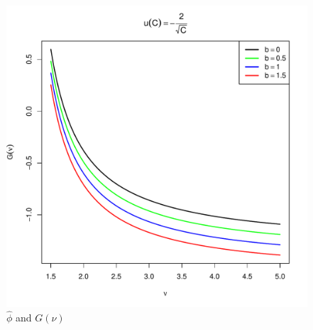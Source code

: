 \documentclass[11pt,a4]{amsart}
\newcommand{\1}{{\mathbf 1}}
\begin{document}
\begin{figure}[htb!]
\begin{minipage}{0.5\linewidth}
  \end{minipage}\hfill
  \begin{minipage}{0.5\linewidth}
    \includegraphics[width=\textwidth]{U_b_t_power.pdf}
  \end{minipage}
  \caption{$\hat\phi$ and $G(\nu)$
    \label{fig:phi_hat_U}
  }
\end{figure}

\end{document}
